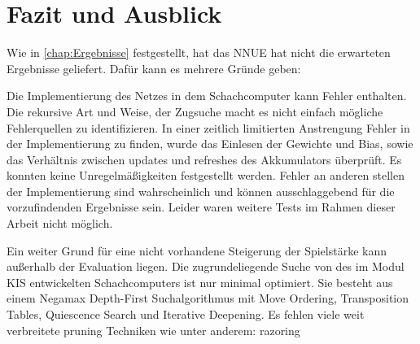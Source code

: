 \chapter{Fazit und Ausblick}

Wie in \autoref{chap:Ergebnisse} festgestellt, hat das \ac{NNUE} hat nicht die erwarteten Ergebnisse geliefert. Dafür kann es mehrere Gründe geben:

Die Implementierung des Netzes in dem Schachcomputer kann Fehler enthalten. Die rekursive Art und Weise, der Zugsuche macht es nicht einfach mögliche Fehlerquellen zu identifizieren. In einer zeitlich limitierten Anstrengung Fehler in der Implementierung zu finden, wurde das Einlesen der Gewichte und Bias, sowie das Verhältnis zwischen updates und refreshes des Akkumulators überprüft. Es konnten keine Unregelmäßigkeiten festgestellt werden. Fehler an anderen stellen der Implementierung sind wahrscheinlich und können ausschlaggebend für die vorzufindenden Ergebnisse sein. Leider waren weitere Tests im Rahmen dieser Arbeit nicht möglich.

Ein weiter Grund für eine nicht vorhandene Steigerung der Spielstärke kann außerhalb der Evaluation liegen. Die zugrundeliegende Suche von des im Modul \ac{KIS} entwickelten Schachcomputers ist nur minimal optimiert. Sie besteht aus einem Negamax Depth-First Suchalgorithmus \cite{Campbell1983} mit Move Ordering, Transposition Tables, Quiescence Search und Iterative Deepening. Es fehlen viele weit verbreitete pruning Techniken wie unter anderem: razoring \cite[S. 123-128]{Levy1988}
